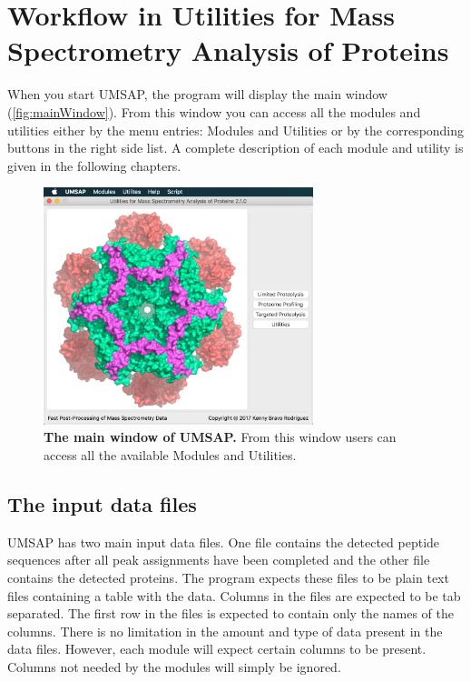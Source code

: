 \chapter{Workflow in Utilities for Mass Spectrometry Analysis of Proteins}
\label{chap:workflow}

When you start UMSAP, the program will display the main window (\autoref{fig:mainWindow}). From this window you can access all the modules and utilities either by the menu entries: Modules and Utilities or by the corresponding buttons in the right side list. A complete description of each module and utility is given in the following chapters.

\begin{figure}[h]
	\centering
	\includegraphics[width=0.7\textwidth]{./IMAGES/MAIN-WINDOW/mainwindow.jpg}	    
	\caption[The main window of UMSAP]{\textbf{The main window of UMSAP.} From this window users can access all the available Modules and Utilities.} 
	\label{fig:mainWindow}
	\vspace{-5pt} 	
\end{figure}  

\section{The input data files}
\label{sec:dataFile}

UMSAP has two main input data files. One file contains the detected peptide sequences after all peak assignments have been completed and the other file contains the detected proteins. The program expects these files to be plain text files containing a table with the data. Columns in the files are expected to be tab separated. The first row in the files is expected to contain only the names of the columns. There is no limitation in the amount and type of data present in the data files. However, each module will expect certain columns to be present. Columns not needed by the modules will simply be ignored.

